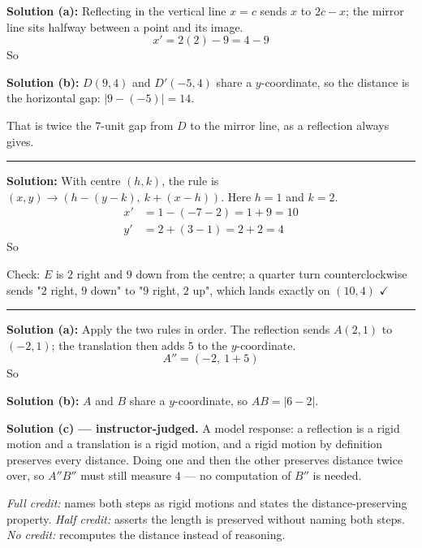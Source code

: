 \documentclass[12pt]{article}
\begin{document}
\textbf{Solution (a):} Reflecting in the vertical line $x = c$ sends $x$ to $2c - x$; the mirror line sits halfway between a point and its image.
\[ x' = 2(2) - 9 = 4 - 9 \]
So 

\textbf{Solution (b):} $D(9, 4)$ and $D'(-5, 4)$ share a $y$-coordinate, so the distance is the horizontal gap: $|9 - (-5)| = 14$. 

That is twice the $7$-unit gap from $D$ to the mirror line, as a reflection always gives.

\vspace{0.2cm}\noindent\rule{\linewidth}{0.2pt}


\textbf{Solution:} With centre $(h, k)$, the rule is $(x, y) \to (h - (y - k),\ k + (x - h))$. Here $h = 1$ and $k = 2$.
\begin{align*}
  x' &= 1 - (-7 - 2) = 1 + 9 = 10 \\
  y' &= 2 + (3 - 1) = 2 + 2 = 4
\end{align*}
So 

Check: $E$ is $2$ right and $9$ down from the centre; a quarter turn counterclockwise sends "$2$ right, $9$ down" to "$9$ right, $2$ up", which lands exactly on $(10, 4)$ $\checkmark$

\vspace{0.2cm}\noindent\rule{\linewidth}{0.2pt}


\textbf{Solution (a):} Apply the two rules in order. The reflection sends $A(2, 1)$ to $(-2, 1)$; the translation then adds $5$ to the $y$-coordinate.
\[ A'' = (-2,\ 1 + 5) \]
So 

\textbf{Solution (b):} $A$ and $B$ share a $y$-coordinate, so $AB = |6 - 2|$. 

\textbf{Solution (c) --- instructor-judged.} A model response: a reflection is a rigid motion and a translation is a rigid motion, and a rigid motion by definition preserves every distance. Doing one and then the other preserves distance twice over, so $A''B''$ must still measure $4$ --- no computation of $B''$ is needed.

\emph{Full credit:} names both steps as rigid motions and states the distance-preserving property. \emph{Half credit:} asserts the length is preserved without naming both steps. \emph{No credit:} recomputes the distance instead of reasoning.
\end{document}
